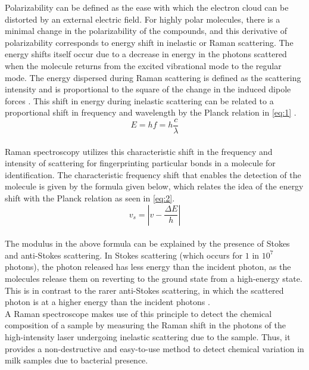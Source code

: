 \noindent Polarizability can be defined as the ease with which the electron cloud can be distorted by an external electric field. For highly polar molecules, there is a minimal change in the polarizability of the compounds, and this derivative of polarizability corresponds to energy shift in inelastic or Raman scattering. The energy shifts itself occur due to a decrease in energy in the photons scattered when the molecule returns from the excited vibrational mode to the regular mode. The energy dispersed during Raman scattering is defined as the scattering intensity and is proportional to the square of the change in the induced dipole forces \cite{TracesLab_RamanUnderstanding}. This shift in energy during inelastic scattering can be related to a proportional shift in frequency and wavelength by the Planck relation in \autoref{eq:1} \cite{EnergyWaveTheory_Ehf}. \\
\begin{equation}
\label{eq:1}
E = hf = h\frac{c}{\lambda} 
\end{equation}
 \\
\noindent Raman spectroscopy utilizes this characteristic shift in the frequency and intensity of scattering for fingerprinting particular bonds in a molecule for identification. The characteristic frequency shift that enables the detection of the molecule is given by the formula given below, which relates the idea of the energy shift with the Planck relation as seen in \autoref{eq:2}\cite{Berciu_Phys502_Raman}. \\
\begin{equation}
\label{eq:2}
v_s = |v - \frac{\Delta E}{h}| 
\end{equation} \\
\noindent The modulus in the above formula can be explained by the presence of Stokes and anti-Stokes scattering. In Stokes scattering (which occurs for $1$ in $10^7$ photons), the photon released has less energy than the incident photon, as the molecules release them on reverting to the ground state from a high-energy state. This is in contrast to the rarer anti-Stokes scattering, in which the scattered photon is at a higher energy than the incident photons \cite{DoITPoMS_StokesStokes}. \\

\noindent A Raman spectroscope makes use of this principle to detect the chemical composition of a sample by measuring the Raman shift in the photons of the high-intensity laser undergoing inelastic scattering due to the sample. Thus, it provides a non-destructive and easy-to-use method to detect chemical variation in milk samples due to bacterial presence.


